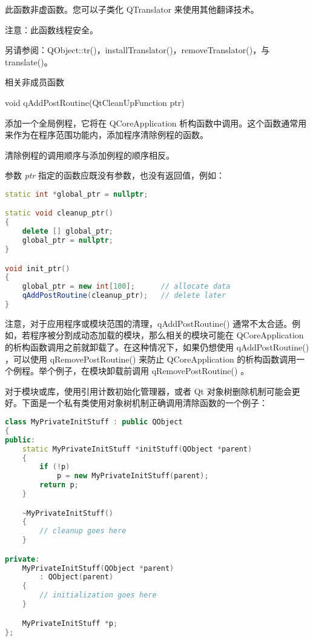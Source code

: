 此函数非虚函数。您可以子类化 QTranslator 来使用其他翻译技术。

注意：此函数线程安全。

另请参阅：QObject::tr()，installTranslator()，removeTranslator()，与 translate()。

\splitLine

相关非成员函数

void qAddPostRoutine(QtCleanUpFunction ptr)

添加一个全局例程，它将在 QCoreApplication 析构函数中调用。这个函数通常用来作为在程序范围功能内，添加程序清除例程的函数。

清除例程的调用顺序与添加例程的顺序相反。

参数 \emph{ptr} 指定的函数应既没有参数，也没有返回值，例如：


\begin{lstlisting}[language=C++]
static int *global_ptr = nullptr;

static void cleanup_ptr()
{
    delete [] global_ptr;
    global_ptr = nullptr;
}

void init_ptr()
{
    global_ptr = new int[100];      // allocate data
    qAddPostRoutine(cleanup_ptr);   // delete later
}
\end{lstlisting}

注意，对于应用程序或模块范围的清理，qAddPostRoutine() 通常不太合适。例如，若程序被分割成动态加载的模块，那么相关的模块可能在 QCoreApplication 的析构函数调用之前就卸载了。在这种情况下，如果仍想使用 qAddPostRoutine() ，可以使用 qRemovePostRoutine() 来防止 QCoreApplication 的析构函数调用一个例程。举个例子，在模块卸载前调用 qRemovePostRoutine() 。

对于模块或库，使用引用计数初始化管理器，或者 Qt 对象树删除机制可能会更
好。下面是一个私有类使用对象树机制正确调用清除函数的一个例子：

\begin{lstlisting}[language=C++]
class MyPrivateInitStuff : public QObject
{
public:
    static MyPrivateInitStuff *initStuff(QObject *parent)
    {
        if (!p)
            p = new MyPrivateInitStuff(parent);
        return p;
    }

    ~MyPrivateInitStuff()
    {
        // cleanup goes here
    }

private:
    MyPrivateInitStuff(QObject *parent)
        : QObject(parent)
    {
        // initialization goes here
    }

    MyPrivateInitStuff *p;
};
\end{lstlisting}


